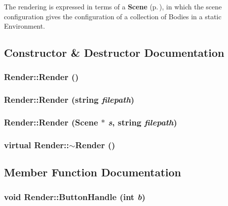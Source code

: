 The rendering is expressed in terms of a {\bf Scene} {\rm (p.\,\pageref{classScene})}, in which the  scene configuration gives the configuration of a collection of Bodies in a static Environment. 



\subsection{Constructor \& Destructor Documentation}
\subsubsection{\setlength{\rightskip}{0pt plus 5cm}Render::Render ()}\label{classRender_a0}


\subsubsection{\setlength{\rightskip}{0pt plus 5cm}Render::Render (string {\em filepath})}\label{classRender_a1}


\subsubsection{\setlength{\rightskip}{0pt plus 5cm}Render::Render ({\bf Scene} $\ast$ {\em s}, string {\em filepath})}\label{classRender_a2}


\subsubsection{\setlength{\rightskip}{0pt plus 5cm}virtual Render::$\sim$Render ()\hspace{0.3cm}{\tt  [inline, virtual]}}\label{classRender_a3}




\subsection{Member Function Documentation}
\subsubsection{\setlength{\rightskip}{0pt plus 5cm}void Render::Button\-Handle (int {\em b})\hspace{0.3cm}{\tt  [virtual]}}\label{classRender_a13}


